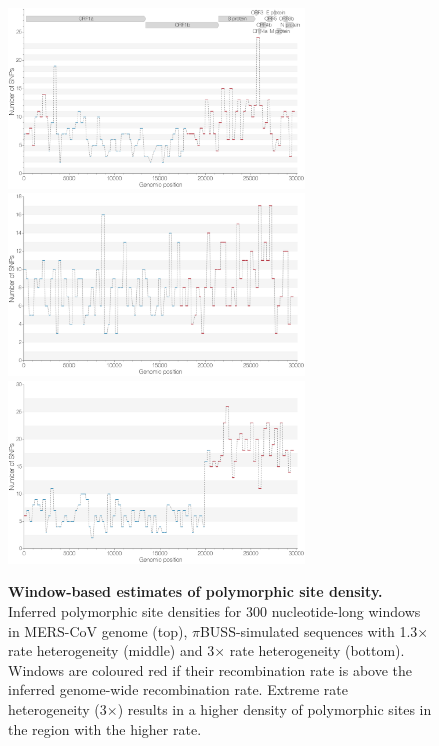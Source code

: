 \documentclass[11pt,oneside,letterpaper]{article}
\begin{document}
\begin{figure}[h]
	\centering	
	\includegraphics[width=0.7\textwidth]{figures/supp_MERS_LDhat_windowSNPs.png}
	\includegraphics[width=0.7\textwidth]{figures/supp_pibuss1.3_LDhat_windowSNPs.png}
	\includegraphics[width=0.7\textwidth]{figures/supp_pibuss3_LDhat_windowSNPs.png}
	\caption{\textbf{Window-based estimates of polymorphic site density.}
Inferred polymorphic site densities for 300 nucleotide-long windows in MERS-CoV genome (top), $\pi$BUSS-simulated sequences with 1.3$\times$ rate heterogeneity (middle) and 3$\times$ rate heterogeneity (bottom).
Windows are coloured red if their recombination rate is above the inferred genome-wide recombination rate.
Extreme rate heterogeneity (3$\times$) results in a higher density of polymorphic sites in the region with the higher rate.}
	\label{SNPs}
\end{figure}
\end{document}
